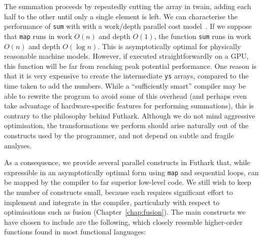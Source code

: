 The summation proceeds by repeatedly cutting the array in twain,
adding each half to the other until only a single element is left.  We
can characterise the performance of \lstinline{sum} with with a
work/depth parallel cost model~\cite{Blelloch:1995:PSF:224164.224210}.
If we suppose that \lstinline{map} runs in work $O(n)$ and depth
$O(1)$, the function \lstinline{sum} runs in work $O(n)$ and depth
$O(\log n)$.  This is asymptotically optimal for physically reasonable
machine models.  However, if executed straightforwardly on a GPU, this
function will be far from reaching peak potential performance.  One
reason is that it is very expensive to create the intermediate
\lstinline{ys} arrays, compared to the time taken to add the numbers.
While a ``sufficiently smart'' compiler may be able to rewrite the
program to avoid some of this overhead (and perhaps even take
advantage of hardware-specific features for performing summations),
this is contrary to the philosophy behind Futhark.  Although we do not
mind aggressive optimisation, the transformations we perform should
arise naturally out of the constructs used by the programmer, and not
depend on subtle and fragile analyses.

As a consequence, we provide several parallel constructs in Futhark
that, while expressible in an asymptotically optimal form using
\lstinline{map} and sequential loops, can be mapped by the compiler to
far superior low-level code.  We still wish to keep the number of
constructs small, because each requires significant effort to
implement and integrate in the compiler, particularly with respect to
optimisations such as fusion (Chapter~\ref{chap:fusion}).  The main
constructs we have chosen to include are the following, which closely
resemble higher-order functions found in most functional languages:

